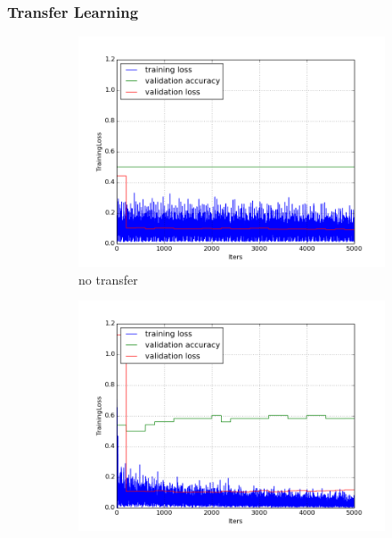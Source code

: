 \documentclass[a4paper,11pt]{article}
\begin{document}
\subsubsection{Transfer Learning}

\begin{figure}
    \centering
    \begin{minipage}[b]{\textwidth}
      \begin{subfigure}{.5\textwidth} 
        \centering
        \includegraphics[scale=0.4]{images/plot_clampdetCI98_tl_wout.png}
        \caption{no transfer}\label{fig:2a}
      \end{subfigure}%
      \begin{subfigure}{.5\textwidth} 
        \centering
        \includegraphics[scale=0.4]{images/plot_clampdetCI98_none_reinit_bs128_lr4.png}

\end{subfigure}
\end{minipage}
\end{figure}
\end{document}
